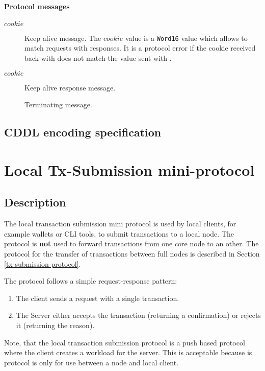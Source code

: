 \paragraph{Protocol messages}
\begin{description}
\item [\MsgKeepAlive{} $cookie$]
  Keep alive message.  The $cookie$ value is a \texttt{Word16} value which allows to
  match requests with responses.  It is a protocol error if the cookie received
  back with \MsgKeepAliveResponse{} does not match the value sent with
  \MsgKeepAlive{}.
\item [\MsgKeepAliveResponse{} $cookie$]
  Keep alive response message. 
\item [\MsgDone]
  Terminating message.
\end{description}

\subsection{CDDL encoding specification}


\section{Local Tx-Submission mini-protocol}
\label{local-tx-submission-protocol}
\subsection{Description}
The local transaction submission mini protocol is used by local clients,
for example wallets or CLI tools, to submit transactions to a local node.
The protocol is {\bf not} used to forward transactions from one core node to an other.
The protocol for the transfer of transactions between full nodes
is described in Section \ref{tx-submission-protocol}.

The protocol follows a simple request-response pattern:
\begin{enumerate}
\item The client sends a request with a single transaction.
\item The Server either accepts the transaction (returning a confirmation) or rejects it (returning the
  reason).
\end{enumerate}
Note, that the local transaction submission protocol is a push based protocol where the client
creates a workload for the server.
This is acceptable because is protocol is only for use between a node and local client.
\newcommand{\MsgSubmitTx}{\trans{MsgSubmitTx}}
\newcommand{\MsgAcceptTx}{\trans{MsgAcceptTx}}
\newcommand{\MsgRejectTx}{\trans{MsgRejectTx}}
